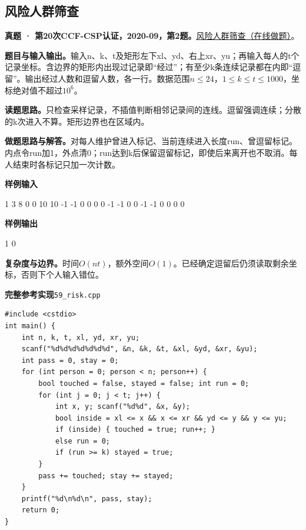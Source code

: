 \documentclass[UTF8,11pt,a4paper,fontset=none]{ctexart}
\begin{document}
\subsection{风险人群筛查}
\textbf{真题 · 第20次CCF-CSP认证，2020-09，第2题。}\href{https://www.acwing.com/problem/content/3296/}{风险人群筛查（在线做题）}。

\noindent\textbf{题目与输入输出。}输入n、k、t及矩形左下xl、yd、右上xr、yu；再输入每人的t个记录坐标。含边界的矩形内出现过记录即“经过”；有至少k条连续记录都在内即“逗留”。输出经过人数和逗留人数，各一行。数据范围$n\le24$，$1\le k\le t\le1000$，坐标绝对值不超过$10^6$。

\noindent\textbf{读题思路。}只检查采样记录，不插值判断相邻记录间的连线。逗留强调连续；分散的k次进入不算。矩形边界也在区域内。

\noindent\textbf{做题思路与解答。}对每人维护曾进入标记、当前连续进入长度run、曾逗留标记。内点令run加1，外点清0；run达到k后保留逗留标记，即使后来离开也不取消。每人结束时各标记只加一次计数。
\begin{tcolorbox}[samplebox,title={输入输出样例}]
\textbf{样例输入}
\begin{Sample}
1 3 8 0 0 10 10
-1 -1 0 0 0 0 -1 -1 0 0 -1 -1 0 0 0 0
\end{Sample}
\tcblower
\textbf{样例输出}
\begin{Sample}
1
0
\end{Sample}
\end{tcolorbox}

\noindent\textbf{复杂度与边界。}时间$O(nt)$，额外空间$O(1)$。已经确定逗留后仍须读取剩余坐标，否则下个人输入错位。
\par\noindent\begin{minipage}{\linewidth}
\textbf{完整参考实现}\quad\texttt{59\_risk.cpp}
\begin{lstlisting}
#include <cstdio>
int main() {
    int n, k, t, xl, yd, xr, yu;
    scanf("%d%d%d%d%d%d%d", &n, &k, &t, &xl, &yd, &xr, &yu);
    int pass = 0, stay = 0;
    for (int person = 0; person < n; person++) {
        bool touched = false, stayed = false; int run = 0;
        for (int j = 0; j < t; j++) {
            int x, y; scanf("%d%d", &x, &y);
            bool inside = xl <= x && x <= xr && yd <= y && y <= yu;
            if (inside) { touched = true; run++; }
            else run = 0;
            if (run >= k) stayed = true;
        }
        pass += touched; stay += stayed;
    }
    printf("%d\n%d\n", pass, stay);
    return 0;
}
\end{lstlisting}
\end{minipage}\par
\end{document}
